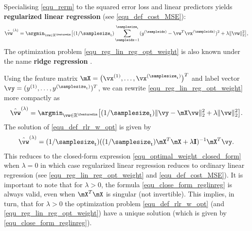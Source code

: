 \documentclass[12pt]{report}
\begin{document}
Specialising \eqref{equ_rerm} to the squared error loss and linear predictors 
yields {\bf regularized linear regression} (see \eqref{equ_def_cost_MSE}): 
\begin{equation} 
\label{equ_reg_lin_reg_opt_weight}
\hat{\vw}^{(\lambda)} = \argmin_{\vw \in \mathbb{R}^{\featuredim}} \big[ (1/\samplesize_{\rm t}) \sum_{\sampleidx=1}^{\samplesize_{\rm t}}  (y^{(\sampleidx)} - \vw^{T}\vx^{(\sampleidx)}  )^2 + \lambda \| \vw \|^{2}_{2}\big], 
\end{equation} 
The optimization problem \eqref{equ_reg_lin_reg_opt_weight} is also known 
under the name {\bf ridge regression} \cite{hastie01statisticallearning}. 


Using the feature matrix $\mX=\big(\vx^{(1)},\ldots,\vx^{(\samplesize_{\rm t})}\big)^{T}$ 
and label vector $\vy=(y^{(1)},\ldots,y^{(\samplesize_{\rm t})})^{T}$, 
we can rewrite \eqref{equ_reg_lin_reg_opt_weight} more compactly as 
\begin{equation} 
\label{equ_def_rlr_w_opt}
\hat{\vw}^{(\lambda)} = \argmin_{\vw \in \mathbb{R}^{\featuredim}} \big[ (1/\samplesize_{\rm t}) \| \vy - \mX \vw \|^{2}_{2} + \lambda \| \vw \|^{2}_{2}\big].
\end{equation} 
The solution of \eqref{equ_def_rlr_w_opt} is given by 
\begin{equation}
\label{equ_close_form_reglinreg}
\hat{\vw}^{(\lambda)} = (1/\samplesize_{\rm t}) ((1/\samplesize_{\rm t}) \mX^{T} \mX + \lambda \mathbf{I})^{-1} \mX^{T} \vy. 
\end{equation}
This reduces to the closed-form expression \eqref{equ_optimal_weight_closed_form} 
when $\lambda=0$ in which case regularized linear regression reduces to ordinary linear 
regression (see \eqref{equ_reg_lin_reg_opt_weight} and \eqref{equ_def_cost_MSE}). It 
is important to note that for $\lambda>0$, the formula \eqref{equ_close_form_reglinreg} 
is always valid, even when $\mX^{T} \mX$ is singular (not invertible). This implies, in turn, 
that for $\lambda> 0$ the optimization problem \eqref{equ_def_rlr_w_opt} (and \eqref{equ_reg_lin_reg_opt_weight}) 
have a unique solution (which is given by \eqref{equ_close_form_reglinreg}). 
\end{document}
